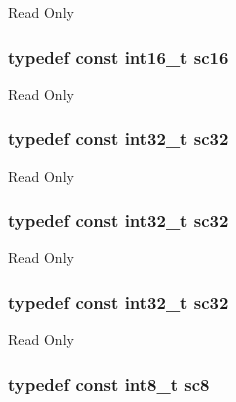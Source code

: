 Read Only \hypertarget{group___exported__types_ga66ab742a0751bb4e7661b8e874f2ddda}{
\subsubsection[{sc16}]{\setlength{\rightskip}{0pt plus 5cm}typedef const int16\-\_\-t {\bf sc16}}}\label{group___exported__types_ga66ab742a0751bb4e7661b8e874f2ddda}
Read Only \hypertarget{group___exported__types_gad97679599f3791409523fdb1c6156a28}{
\subsubsection[{sc32}]{\setlength{\rightskip}{0pt plus 5cm}typedef const int32\-\_\-t {\bf sc32}}}\label{group___exported__types_gad97679599f3791409523fdb1c6156a28}
Read Only \hypertarget{group___exported__types_gad97679599f3791409523fdb1c6156a28}{
\subsubsection[{sc32}]{\setlength{\rightskip}{0pt plus 5cm}typedef const int32\-\_\-t {\bf sc32}}}\label{group___exported__types_gad97679599f3791409523fdb1c6156a28}
Read Only \hypertarget{group___exported__types_gad97679599f3791409523fdb1c6156a28}{
\subsubsection[{sc32}]{\setlength{\rightskip}{0pt plus 5cm}typedef const int32\-\_\-t {\bf sc32}}}\label{group___exported__types_gad97679599f3791409523fdb1c6156a28}
Read Only \hypertarget{group___exported__types_ga30e6c0f6718e1b6d26dc9d94ddcf9d11}{
\subsubsection[{sc8}]{\setlength{\rightskip}{0pt plus 5cm}typedef const int8\-\_\-t {\bf sc8}}}\label{group___exported__types_ga30e6c0f6718e1b6d26dc9d94ddcf9d11}
